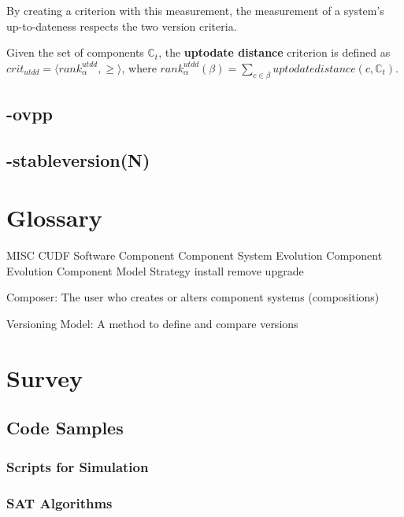 By creating a criterion with this measurement, the measurement of a system's up-to-dateness respects the two version criteria.
\begin{defs}
	Given the set of components $\mathbb{C}_t$, the \textbf{uptodate distance} criterion is defined as $crit_{utdd} = \langle rank^{utdd}_{\alpha}, \geq \rangle$,
	where $rank^{utdd}_{\alpha}(\beta) = \sum_{c \in \beta} uptodatedistance(c,\mathbb{C}_t)$.
\end{defs}

\section{-ovpp}

\section{-stableversion(N)}


\chapter{Glossary}
MISC
CUDF
Software Component
Component System Evolution
Component Evolution
Component Model
Strategy
install
remove
upgrade

Composer: The user who creates or alters component systems (compositions)

Versioning Model: A method to define and compare versions

\chapter{Survey}
\label{apx.survey}

\section{Code Samples}
\subsection{Scripts for Simulation}
\subsection{SAT Algorithms}